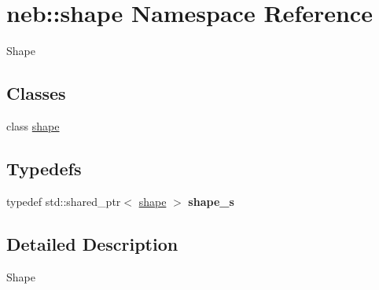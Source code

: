 \hypertarget{namespaceneb_1_1shape}{\section{neb\-:\-:shape \-Namespace \-Reference}
\label{namespaceneb_1_1shape}
}


\-Shape  


\subsection*{\-Classes}
\begin{DoxyCompactItemize}
\item 
class \hyperlink{classneb_1_1shape_1_1shape}{shape}
\end{DoxyCompactItemize}
\subsection*{\-Typedefs}
\begin{DoxyCompactItemize}
\item 
\hypertarget{namespaceneb_1_1shape_a58bf0011e8ddcda0407412de30baa400}{typedef std\-::shared\-\_\-ptr$<$ \hyperlink{classneb_1_1shape_1_1shape}{shape} $>$ {\bfseries shape\-\_\-s}}\label{namespaceneb_1_1shape_a58bf0011e8ddcda0407412de30baa400}

\end{DoxyCompactItemize}


\subsection{\-Detailed \-Description}
\-Shape 